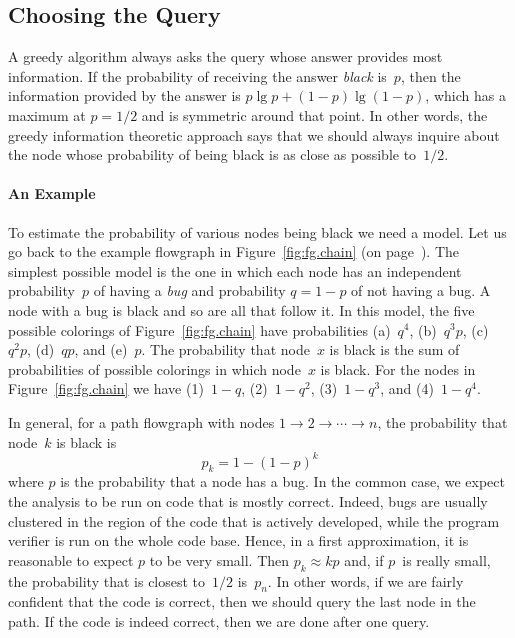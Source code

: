 \documentclass[a4paper]{article}
\theoremstyle{slanted}
\theoremstyle{definition}
\theoremstyle{remark}
\begin{document}
\subsection{Choosing the Query}
\label{sec:ra.heuristic}

A greedy algorithm always asks the query whose answer provides
most information. If the probability of receiving the answer
\textit{black} is~$p$, then the information provided by the
answer is $p\lg p + (1-p)\lg(1-p)$, which has a maximum at
$p=1/2$ and is symmetric around that point. In other words, the
greedy information theoretic approach says that we should always
inquire about the node whose probability of being black is as
close as possible to~$1/2$.

\paragraph{An Example}

To estimate the probability of various nodes being black we
need a model. Let us go back to the example flowgraph in
Figure~\ref{fig:fg.chain} (on page~\pageref{fig:fg.chain}).
The simplest possible model is the one in which each node has
an independent probability~$p$ of having a \emph{bug} and
probability $q=1-p$ of not having a bug. A node with a bug
is black and so are all that follow it. In this model, the
five possible colorings of Figure~\ref{fig:fg.chain} have
probabilities (a)~$q^4$, (b)~$q^3p$, (c)~$q^2p$, (d)~$qp$, and
(e)~$p$. The probability that node~$x$ is black is the sum of
probabilities of possible colorings in which node~$x$ is black.
For the nodes in Figure~\ref{fig:fg.chain} we have (1)~$1-q$,
(2)~$1-q^2$, (3)~$1-q^3$, and (4)~$1-q^4$.

In general, for a path flowgraph with nodes $1\to2\to\cdots\to
n$, the probability that node~$k$ is black is
\begin{equation}
p_k = 1 - (1 - p)^k
\end{equation}
where $p$ is the probability that a node has a bug. In the common
case, we expect the analysis to be run on code that is mostly
correct. Indeed, bugs are usually clustered in the region of the
code that is actively developed, while the program verifier is
run on the whole code base. Hence, in a first approximation, it
is reasonable to expect $p$ to be very small. Then $p_k\approx
kp$ and, if $p$~is really small, the probability that is closest
to~$1/2$ is~$p_n$. In other words, if we are fairly confident
that the code is correct, then we should query the last node in
the path. If the code is indeed correct, then we are done after
one query.
\end{document}
